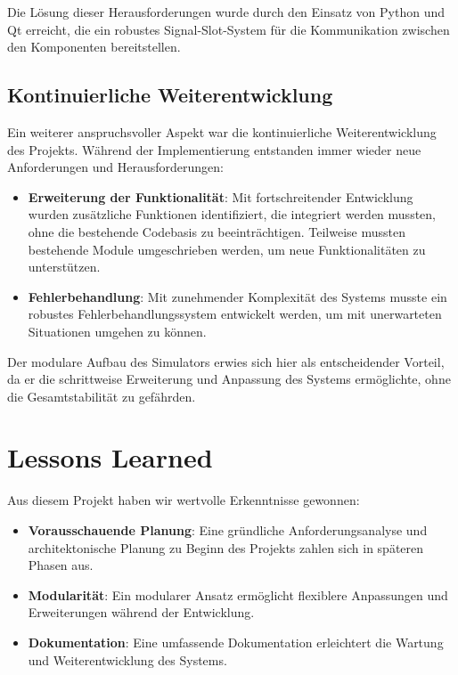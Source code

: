 Die Lösung dieser Herausforderungen wurde durch den Einsatz von Python und Qt erreicht, die ein robustes Signal-Slot-System für die Kommunikation zwischen den Komponenten bereitstellen.

\subsection{Kontinuierliche Weiterentwicklung}

Ein weiterer anspruchsvoller Aspekt war die kontinuierliche Weiterentwicklung des Projekts. Während der Implementierung entstanden immer wieder neue Anforderungen und Herausforderungen:

\begin{itemize}
    \item \textbf{Erweiterung der Funktionalität}: Mit fortschreitender Entwicklung wurden zusätzliche Funktionen identifiziert, die integriert werden mussten, ohne die bestehende Codebasis zu beeinträchtigen. Teilweise mussten bestehende Module umgeschrieben werden, um neue Funktionalitäten zu unterstützen.
    \item \textbf{Fehlerbehandlung}: Mit zunehmender Komplexität des Systems musste ein robustes Fehlerbehandlungssystem entwickelt werden, um mit unerwarteten Situationen umgehen zu können.
\end{itemize}

Der modulare Aufbau des Simulators erwies sich hier als entscheidender Vorteil, da er die schrittweise Erweiterung und Anpassung des Systems ermöglichte, ohne die Gesamtstabilität zu gefährden.

\section{Lessons Learned}

Aus diesem Projekt haben wir wertvolle Erkenntnisse gewonnen:

\begin{itemize}
    \item \textbf{Vorausschauende Planung}: Eine gründliche Anforderungsanalyse und architektonische Planung zu Beginn des Projekts zahlen sich in späteren Phasen aus.
    \item \textbf{Modularität}: Ein modularer Ansatz ermöglicht flexiblere Anpassungen und Erweiterungen während der Entwicklung. 
    \item \textbf{Dokumentation}: Eine umfassende Dokumentation erleichtert die Wartung und Weiterentwicklung des Systems.
\end{itemize}

